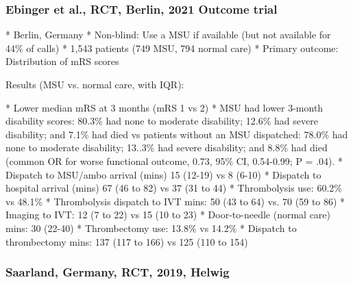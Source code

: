 \subsubsection{Ebinger et al., RCT, Berlin, 2021 Outcome trial \cite{ebinger_association_2021}}

\begin{markdown}
* Berlin, Germany
* Non-blind: Use a MSU if available (but not available for 44\% of calls)
* 1,543 patients (749 MSU, 794 normal care)
* Primary outcome: Distribution of mRS scores
\end{markdown}

Results (MSU vs. normal care, with IQR):

\begin{markdown}
* Lower median mRS at 3 months (mRS 1 vs 2)
* MSU had lower 3-month  disability scores: 80.3\% had none to moderate disability; 12.6\% had severe disability; and 7.1\% had died vs patients without an MSU dispatched: 78.0\% had none to moderate disability; 13..3\% had severe disability; and 8.8\% had died (common OR for worse functional outcome, 0.73, 95\% CI, 0.54-0.99; P = .04).
* Dispatch to MSU/ambo arrival (mins) 15 (12-19) vs 8 (6-10)
* Dispatch to hospital arrival (mins) 67 (46 to 82) vs 37 (31 to 44)
* Thrombolysis use: 60.2\% vs 48.1\%
* Thrombolysis dispatch to IVT mins: 50 (43 to 64) vs. 70 (59 to 86)
* Imaging to IVT: 12 (7 to 22) vs 15 (10 to 23)
* Door-to-needle (normal care) mins: 30 (22-40)
* Thrombectomy use: 13.8\% vs 14.2\%
* Dispatch to thrombectomy mins: 137 (117 to 166) vs 125 (110 to 154)
\end{markdown}

\subsubsection{Saarland, Germany, RCT, 2019, Helwig \cite{helwig_prehospital_2019}}

